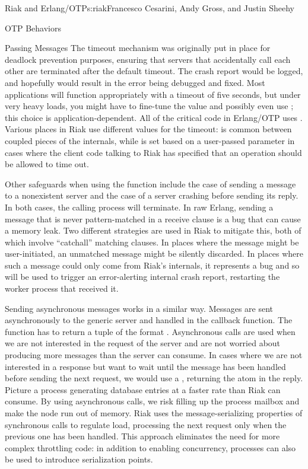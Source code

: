 \begin{aosachapter}{Riak and Erlang/OTP}{s:riak}{Francesco Cesarini, Andy Gross, and Justin Sheehy}
\begin{aosasect1}{OTP Behaviors}
\begin{aosasect2}{Passing Messages}
The timeout mechanism was originally put in place for deadlock
prevention purposes, ensuring that servers that accidentally call each
other are terminated after the default timeout. The crash report would
be logged, and hopefully would result in the error being debugged and
fixed. Most applications will function appropriately with a timeout of
five seconds, but under very heavy loads, you might have to fine-tune
the value and possibly even use ; this choice is
application-dependent. All of the critical code in Erlang/OTP uses
.  Various places in Riak use different values for the
timeout:  is common between coupled pieces of the
internals, while  is set based on a user-passed
parameter in cases where the client code talking to Riak has specified
that an operation should be allowed to time out.

Other safeguards when using the  function
include the case of sending a message to a nonexistent server and
the case of a server crashing before sending its reply. In
both cases, the calling process will terminate. In raw Erlang, sending
a message that is never pattern-matched in a receive clause is a bug
that can cause a memory leak. Two different strategies are used in
Riak to mitigate this, both of which involve ``catchall'' matching
clauses.  In places where the message might be user-initiated, an
unmatched message might be silently discarded.  In places where such a
message could only come from Riak's internals, it represents a bug and
so will be used to trigger an error-alerting internal crash report,
restarting the worker process that received it.

Sending asynchronous messages works in a similar way. Messages are
sent asynchronously to the generic server and handled in the
 callback function. The function has to return a
tuple of the format . Asynchronous calls are
used when we are not interested in the request of the server and are
not worried about producing more messages than the server can
consume. In cases where we are not interested in a response but want
to wait until the message has been handled before sending the next
request, we would use a , returning the atom
 in the reply. Picture a process generating database entries
at a faster rate than Riak can consume. By using asynchronous calls,
we risk filling up the process mailbox and make the node run out of
memory.  Riak uses the message-serializing properties of synchronous
 calls to regulate load, processing the next request
only when the previous one has been handled.  This approach eliminates
the need for more complex throttling code: in addition to enabling
concurrency,  processes can also be used to
introduce serialization points.


\end{aosasect2}
\end{aosasect1}
\end{aosachapter}

